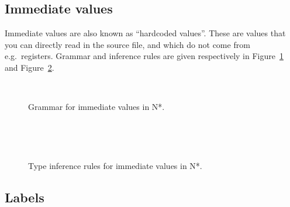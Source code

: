 \subsection{Immediate values}\label{subsec:nstar-common-expressions-immediate}

Immediate values are also known as ``hardcoded values''.
These are values that you can directly read in the source file, and which do not come from e.g.\ registers.
Grammar and inference rules are given respectively in Figure~\ref{fig:nstar-common-expressions-immediate-grammar} and Figure~\ref{fig:nstar-common-expressions-immediate-typerules}.

\begin{figure}[H]
  \centering
  \\
  \caption{Grammar for immediate values in N*.}
  \label{fig:nstar-common-expressions-immediate-grammar}
\end{figure}

\begin{figure}[H]
  \centering

  \begin{prooftree}
  \end{prooftree}
  \\\vspace{\baselineskip}
  \begin{prooftree}
  \end{prooftree}
  \\\vspace{\baselineskip}
  \begin{prooftree}
  \end{prooftree}

  \caption{Type inference rules for immediate values in N*.}
  \label{fig:nstar-common-expressions-immediate-typerules}
\end{figure}

\subsection{Labels}\label{subsec:nstar-common-expressions-labels}

